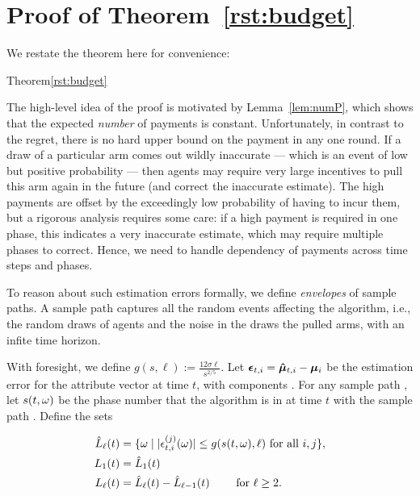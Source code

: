 \section{Proof of Theorem~\ref{rst:budget}}
\label{sec:payment-proof}

We restate the theorem here for convenience:

\begin{rtheorem}{Theorem}{\ref{rst:budget}}
\end{rtheorem}

The high-level idea of the proof is motivated by Lemma~\ref{lem:numP},
which shows that the expected \emph{number} of payments is constant.
Unfortunately, in contrast to the regret, there is no hard upper bound
on the payment in any one round.
If a draw of a particular arm comes out wildly inaccurate --- which is
an event of low but positive probability ---
then agents may require very large incentives to pull this arm again
in the future (and correct the inaccurate estimate).
The high payments are offset by the exceedingly low probability of
having to incur them, but a rigorous analysis requires some care:
if a high payment is required in one phase, this indicates a very
inaccurate estimate, which may require multiple phases to correct.
Hence, we need to handle dependency of payments across time steps and
phases.

To reason about such estimation errors formally, we define
\emph{envelopes} of sample paths.
A sample path \SP captures all the random events affecting the
algorithm, i.e., the random draws  of agents and the
noise \Noise[t] in the draws the pulled arms,
with an infite  time horizon.

With foresight, we define $g(s, \ell) := \frac{12 \sigma \ell}{s^{2/5}}$.
Let $\bm{\epsilon}_{t,i} = \bm{\hat{\mu}}_{t,i} - \bm{\mu}_{i}$ be the estimation
error for the attribute vector  at time $t$,
with components .
For any sample path \SP, let $s (t,\omega)$ be the phase number that the
algorithm is in at time $t$ with the sample path \SP.
Define the sets

\begin{align*}
\hat{L}_\ell(t)
  & = \Set{\SP}{|\Err{t}{i}{j}(\SP)| \leq g(s(t,\SP),\ell)
    \mbox{ for all } i,j},\\
\Env[t]{1} & = \hat{L}_1(t)\\ 
\Env[t]{\ell} & = \hat{L}_{\ell} (t) - \hat{L}_{\ell-1} (t)
  \qquad \mbox{ for } \ell \geq 2.
\end{align*}


